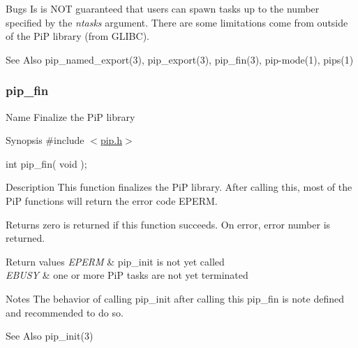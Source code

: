 \begin{DoxyParagraph}{Bugs}
Is is N\-O\-T guaranteed that users can spawn tasks up to the number specified by the {\itshape ntasks} argument. There are some limitations come from outside of the Pi\-P library (from G\-L\-I\-B\-C). \par
\par

\end{DoxyParagraph}
\begin{DoxySeeAlso}{See Also}
pip\-\_\-named\-\_\-export(3), pip\-\_\-export(3), pip\-\_\-fin(3), pip-\/mode(1), pips(1) \par
\par

\end{DoxySeeAlso}
\hypertarget{pip_fin}{}\subsubsection{pip\-\_\-fin}\label{pip_fin}
\begin{DoxyParagraph}{Name}
Finalize the Pi\-P library
\end{DoxyParagraph}
\begin{DoxyParagraph}{Synopsis}
\#include $<$\hyperlink{pip_8h_source}{pip.\-h}$>$ \par
int pip\-\_\-fin( void );
\end{DoxyParagraph}
\begin{DoxyParagraph}{Description}
This function finalizes the Pi\-P library. After calling this, most of the Pi\-P functions will return the error code {\ttfamily E\-P\-E\-R\-M}.
\end{DoxyParagraph}
\begin{DoxyReturn}{Returns}
zero is returned if this function succeeds. On error, error number is returned. 
\end{DoxyReturn}

\begin{DoxyRetVals}{Return values}
{\em E\-P\-E\-R\-M} & {\ttfamily pip\-\_\-init} is not yet called \\
\hline
{\em E\-B\-U\-S\-Y} & {\ttfamily one} or more Pi\-P tasks are not yet terminated\\
\hline
\end{DoxyRetVals}
\begin{DoxyParagraph}{Notes}
The behavior of calling {\ttfamily pip\-\_\-init} after calling this {\ttfamily pip\-\_\-fin} is note defined and recommended to do so.
\end{DoxyParagraph}
\par
\par
\begin{DoxySeeAlso}{See Also}
pip\-\_\-init(3) 
\end{DoxySeeAlso}
